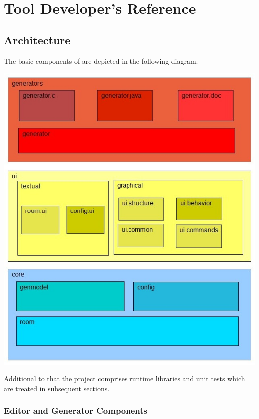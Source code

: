 \chapter{\eTrice{} Tool Developer's Reference}

\section{Architecture}

The basic components of \eTrice{} are depicted in the following diagram.

\includegraphics[scale=0.5]{images/200-components.jpg}

Additional to that the \eTrice{} project comprises runtime libraries and unit tests which are treated in 
subsequent sections.

\subsection{Editor and Generator Components}

